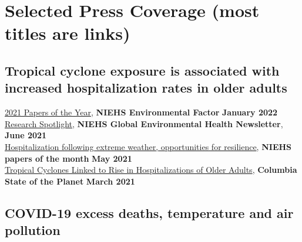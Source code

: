 \section*{Selected Press Coverage (most titles are links)}



\subsection*{Tropical cyclone exposure is associated with increased hospitalization rates in older adults}

\href{https://factor.niehs.nih.gov/2022/1/papers/papers-of-the-year/index.htm}{2021 Papers of the Year}, \textbf{NIEHS Environmental Factor} \hfill \textbf{January 2022}\\
\href{https://www.niehs.nih.gov/research/programs/geh/geh_newsletter/2021/6/spotlight/hurricanes_and_tropical_cyclones_associated_with_increased_hospitalization_rates_in_older_adults.cfm}{Research Spotlight}, \textbf{NIEHS Global Environmental Health Newsletter}, \hfill \textbf{June 2021}\\
\href{https://factor.niehs.nih.gov/2021/5/papers/dert/index.htm?utm_source=efactor-newsletter&utm_medium=email&utm_campaign=efactor-newsletter-2021-May#a3}{Hospitalization following extreme weather, opportunities for resilience}, \textbf{NIEHS papers of the month} \hfill \textbf{May 2021}\\
\href{https://news.climate.columbia.edu/2021/03/09/tropical-cyclones-linked-rise-hospitalizations-older-adults/}{Tropical Cyclones Linked to Rise in Hospitalizations of Older Adults}, \textbf{Columbia State of the Planet} \hfill \textbf{March 2021}

\subsection*{COVID-19 excess deaths, temperature and air pollution}


